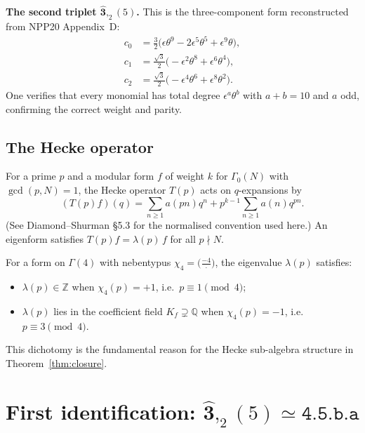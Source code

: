 \documentclass[12pt]{amsart}
\theoremstyle{definition}
\newcommand{\Z}{\mathbb{Z}}
\newcommand{\Q}{\mathbb{Q}}
\newcommand{\Gam}{\Gamma}
\newcommand{\lmfdb}[1]{\texttt{#1}}  %
\newcommand{\hhat}[1]{\widehat{\mathbf{#1}}}  %
\newcommand{\Tp}{T(p)}
\begin{document}
\medskip
\noindent\textbf{The second triplet $\hhat{3},_2(5)$.}
This is the three-component form reconstructed from NPP20 Appendix~D:
\begin{equation}\label{eq:3hat25}
\begin{aligned}
  c_0 &= \tfrac{3}{2}\bigl(\epsilon\theta^9 - 2\epsilon^5\theta^5
         + \epsilon^9\theta\bigr), \\
  c_1 &= \tfrac{\sqrt{3}}{2}\bigl(-\epsilon^2\theta^8
         + \epsilon^6\theta^4\bigr), \\
  c_2 &= \tfrac{\sqrt{3}}{2}\bigl(-\epsilon^4\theta^6
         + \epsilon^8\theta^2\bigr).
\end{aligned}
\end{equation}
One verifies that every monomial has total degree $\epsilon^a\theta^b$
with $a+b=10$ and $a$ odd, confirming the correct weight and parity.

\subsection{The Hecke operator}

For a prime $p$ and a modular form $f$ of weight $k$ for $\Gam_0(N)$
with $\gcd(p,N)=1$, the Hecke operator $\Tp$ acts on $q$-expansions by
\begin{equation}\label{eq:hecke}
  (\Tp f)(q) = \sum_{n\geq 1} a(pn)q^n
  + p^{k-1}\sum_{n\geq 1} a(n)q^{pn}.
\end{equation}
(See Diamond--Shurman \cite{DiamondShurman} \S5.3 for the normalised
convention used here.)
An eigenform satisfies $T(p)f = \lambda(p)\,f$ for all $p \nmid N$.

For a form on $\Gam(4)$ with nebentypus $\chi_4 = \bigl(\tfrac{-4}{\cdot}\bigr)$,
the eigenvalue $\lambda(p)$ satisfies:
\begin{itemize}
  \item $\lambda(p) \in \Z$ when $\chi_4(p)=+1$, i.e.\ $p\equiv 1\pmod{4}$;
  \item $\lambda(p)$ lies in the coefficient field $K_f \supsetneq \Q$
    when $\chi_4(p)=-1$, i.e.\ $p\equiv 3\pmod{4}$.
\end{itemize}
This dichotomy is the fundamental reason for the Hecke sub-algebra
structure in Theorem~\ref{thm:closure}.

\section{First identification: \texorpdfstring{$\hhat{3},_2(5) \simeq
         \lmfdb{4.5.b.a}$}{3-hat,2(5) = 4.5.b.a}}
\label{sec:first-id}
\end{document}
